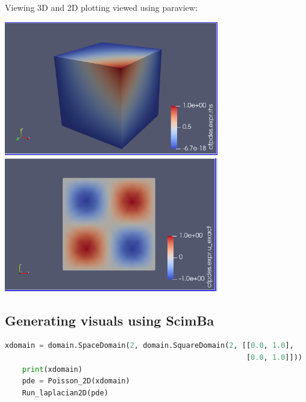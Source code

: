 \documentclass[12pt]{article}
\begin{document}
Viewing 3D and 2D plotting viewed using paraview:

\begin{frame}{}
    \begin{center}
        \includegraphics[width=0.7\textwidth]{images/paraview 3d.png}
        \includegraphics[width=0.7\textwidth]{images/laplacian2d2d.png}
    \end{center}
\end{frame}

\newpage

\subsection{Generating visuals using ScimBa}
\begin{lstlisting}[language=Python,caption={},frame=single, backgroundcolor=\color{gray!10}, basicstyle=\footnotesize,rulecolor=\color{blue}, framexleftmargin=3pt, commentstyle=\color{mygreen}, keywordstyle=\color{blue}]
    xdomain = domain.SpaceDomain(2, domain.SquareDomain(2, [[0.0, 1.0], 
                                                        [0.0, 1.0]]))
    print(xdomain)
    pde = Poisson_2D(xdomain)
    Run_laplacian2D(pde)
    
\end{lstlisting}
    
\end{document}
